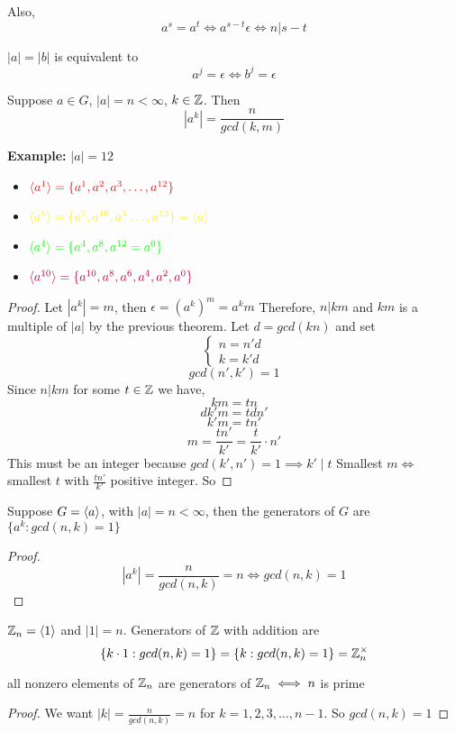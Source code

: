 \documentclass[openany]{report}
\begin{document}
Also,
$$a^s = a^t \iff a^{s-t} \epsilon \iff n|s-t$$
\begin{corollary}
    $|a| = |b|$ is equivalent to 
    $$a^j = \epsilon \iff b^j = \epsilon$$
\end{corollary}
\begin{prop}
    Suppose $a \in G$, $|a| = n < \infty$, $k\in \mathbb{Z}$. Then
    $$|a^k| = \frac{n}{gcd(k,m)}$$
\end{prop}
\textbf{Example:} $|a| = 12$
\begin{itemize}
    \item $\textcolor{red}{\langle a^1 \rangle = \{a^1, a^2, a^3, \dots, a^{12}\}}$
    \item $\yellow{\bangles{a^5} = \{a^5, a^{10}, a^3 \dots, a^{12}\} = \bangles{a}}$
    \item $\textcolor{green}{\langle a^4 \rangle = \{a^4, a^8, a^{12} = a^0\}}$
    \item $\textcolor{purple}{\langle a^{10} \rangle = \{a^{10}, a^{8}, a^{6}, a^{4}, a^{2}, a^0\}}$
\end{itemize}
\begin{proof}
    Let $|a^k| = m$, then $\epsilon = (a^k)^m = a^km$
    Therefore, $n |km$ and $km$ is a multiple of $|a|$ by the previous theorem. Let $d = gcd(kn)$ and set\\
    $$\begin{cases}
        n = n'd\\
        k = k'd
    \end{cases}$$
    $$gcd(n',k') = 1$$
    Since $n | km$ for some $t \in \mathbb{Z}$ we have,
    $$km = tn$$
    $$dk'm = tdn'$$
    $$k'm = tn'$$
    $$m = \frac{tn'}{k'} = \frac{t}{k'}\cdot n'$$
    This must be an integer because $gcd(k', n') = 1 \implies k' \mid t$
    Smallest $m \iff$ smallest $t$ with $\frac{tn'}{k'}$ positive integer. So
\end{proof}
\begin{corollary}
    Suppose $G = \langle a \rangle$, with $|a| = n < \infty$, then the generators of $G$ are $\{a^k: gcd(n,k) = 1\}$
\end{corollary}
\begin{proof}
    \[|a^k| = \frac{n}{gcd(n,k)} = n \iff gcd(n,k) = 1\]
\end{proof}
\begin{corollary}
    $\mathbb{Z}_n = \langle 1 \rangle$ and $|1| = n$. Generators of $\mathbb{Z}$ with addition are 
    $$\{k \cdot 1 : gcd(n,k) = 1\} = \{k : gcd(n,k)=1\} = \mathbb{Z}_n^\times$$
\end{corollary}
\begin{corollary}
    all nonzero elements of $\mathbb{Z}_n$ are generators of $\mathbb{Z}_n \iff n$ is prime
\end{corollary}
\begin{proof}
    We want $|k| = \frac{n}{gcd(n,k)} = n$ for $k = 1,2,3,\dots, n-1$. So $gcd(n,k) = 1$
\end{proof}
\end{document}
